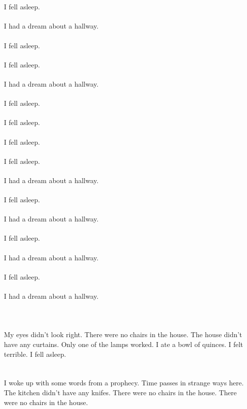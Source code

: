 \documentclass{article}
\begin{document}
    \section{}
    I fell asleep.\\\\I had a dream about a hallway.\\\\ I fell asleep.\\\\ I fell asleep.\\\\I had a dream about a hallway.\\\\ I fell asleep.\\\\ I fell asleep.\\\\ I fell asleep.\\\\ I fell asleep.\\\\I had a dream about a hallway.\\\\ I fell asleep.\\\\I had a dream about a hallway.\\\\ I fell asleep.\\\\I had a dream about a hallway.\\\\ I fell asleep.\\\\I had a dream about a hallway.\\\\ 
    \newpage
    
    \section{}
    My eyes didn't look right. There were no chairs in the house. The house didn't have any curtains. Only one of the lamps worked. I ate a bowl of quinces. I felt terrible. I fell asleep.  
    \newpage
    
    \section{}
    I woke up with some words from a prophecy. Time passes in strange ways here. The kitchen didn't have any knifes. There were no chairs in the house. There were no chairs in the house.  
    \newpage
    
\end{document}

